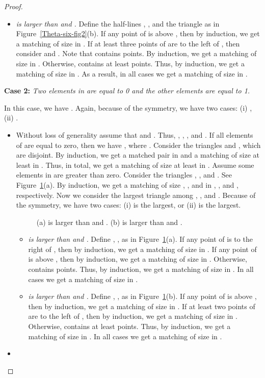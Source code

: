 \documentclass[11pt,a4paper]{article}
\begin{document}
\begin{proof}
\begin{itemize}
\begin{itemize}
\item {\em  is larger than  and .}
Define the half-lines , , and the triangle  as in Figure~\ref{Theta-six-fig2}(b). If any point of  is above , then by induction, we get a matching of size  in . If at least three points of  are to the left of , then consider  and . Note that  contains  points. By induction, we get a matching of size  in . Otherwise,  contains at least  points. Thus, by induction, we get a matching of size  in . As a result, in all cases we get a matching of size  in .
\end{itemize}
\end{itemize}


{\bf Case 2:} {\em Two elements in  are equal to 0 and the other elements are equal to 1.}

In this case, we have . Again, because of the symmetry, we have two cases: (i) , (ii) .

\begin{itemize}
 \item 

Without loss of generality assume that  and . Thus, , , , and . If all elements of  are equal to zero, then we have , where . Consider the triangles  and , which are disjoint. By induction, we get a matched pair in  and a matching of size at least  in . Thus, in total, we get a matching of size at least  in . Assume some elements in  are greater than zero. Consider the triangles , , and . See Figure~\ref{Theta-six-fig3}(a). By induction, we get a matching of size , , and  in , , and , respectively. 
Now we consider the largest triangle among , , and . Because of the symmetry, we have two cases: (i)  is the largest, or (ii)  is the largest.

\begin{figure}[h!]
  \centering
\setlength{\tabcolsep}{0in}
  
  \caption{(a)  is larger than  and . (b)  is larger than  and .}
\label{Theta-six-fig3}
\end{figure}
\begin{itemize}
 \item {\em  is larger than  and .}
Define , ,  as in Figure~\ref{Theta-six-fig3}(a). If any point of  is to the right of , then by induction, we get a matching of size  in . If any point of  is above , then by induction, we get a matching of size  in . Otherwise,  contains  points. Thus, by induction, we get a matching of size  in . In all cases we get a matching of size  in .

\item {\em  is larger than  and .}
Define , ,  as in Figure~\ref{Theta-six-fig3}(b). If any point of  is above , then by induction, we get a matching of size  in . If at least two points of  are to the left of , then by induction, we get a matching of size  in . Otherwise,  contains at least  points. Thus, by induction, we get a matching of size  in . In all cases we get a matching of size  in .
\end{itemize}
  \item 


\end{itemize}
\end{proof}
\end{document}
